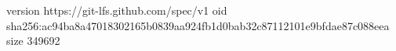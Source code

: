 version https://git-lfs.github.com/spec/v1
oid sha256:ac94ba8a47018302165b0839aa924fb1d0bab32c87112101e9bfdae87c088eea
size 349692
